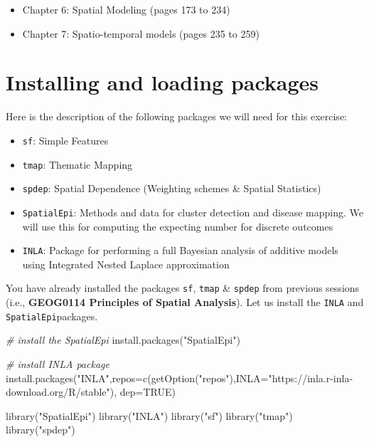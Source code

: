 \documentclass[
]{book}
\newenvironment{Shaded}{\begin{snugshade}}{\end{snugshade}}
\newcommand{\AttributeTok}[1]{\textcolor[rgb]{0.77,0.63,0.00}{#1}}
\newcommand{\CommentTok}[1]{\textcolor[rgb]{0.56,0.35,0.01}{\textit{#1}}}
\newcommand{\ConstantTok}[1]{\textcolor[rgb]{0.00,0.00,0.00}{#1}}
\newcommand{\FunctionTok}[1]{\textcolor[rgb]{0.00,0.00,0.00}{#1}}
\newcommand{\NormalTok}[1]{#1}
\newcommand{\StringTok}[1]{\textcolor[rgb]{0.31,0.60,0.02}{#1}}
\begin{document}
\begin{itemize}
\item
  Chapter 6: Spatial Modeling (pages 173 to 234)
\item
  Chapter 7: Spatio-temporal models (pages 235 to 259)
\end{itemize}

\hypertarget{installing-and-loading-packages}{%
\section{Installing and loading packages}\label{installing-and-loading-packages}}

Here is the description of the following packages we will need for this exercise:

\begin{itemize}
\item
  \texttt{sf}: Simple Features
\item
  \texttt{tmap}: Thematic Mapping
\item
  \texttt{spdep}: Spatial Dependence (Weighting schemes \& Spatial Statistics)
\item
  \texttt{SpatialEpi}: Methods and data for cluster detection and disease mapping. We will use this for computing the expecting number for discrete outcomes
\item
  \texttt{INLA}: Package for performing a full Bayesian analysis of additive models using Integrated Nested Laplace approximation
\end{itemize}

You have already installed the packages \texttt{sf}, \texttt{tmap} \& \texttt{spdep} from previous sessions (i.e., \textbf{GEOG0114 Principles of Spatial Analysis}). Let us install the \texttt{INLA} and \texttt{SpatialEpi}packages.

\begin{Shaded}
\begin{Highlighting}[]
\CommentTok{\# install the SpatialEpi}
\FunctionTok{install.packages}\NormalTok{(}\StringTok{"SpatialEpi"}\NormalTok{)}

\CommentTok{\# install INLA package}
\FunctionTok{install.packages}\NormalTok{(}\StringTok{"INLA"}\NormalTok{,}\AttributeTok{repos=}\FunctionTok{c}\NormalTok{(}\FunctionTok{getOption}\NormalTok{(}\StringTok{"repos"}\NormalTok{),}\AttributeTok{INLA=}\StringTok{"https://inla.r{-}inla{-}download.org/R/stable"}\NormalTok{), }\AttributeTok{dep=}\ConstantTok{TRUE}\NormalTok{)}

\FunctionTok{library}\NormalTok{(}\StringTok{"SpatialEpi"}\NormalTok{)}
\FunctionTok{library}\NormalTok{(}\StringTok{"INLA"}\NormalTok{)}
\FunctionTok{library}\NormalTok{(}\StringTok{"sf"}\NormalTok{)}
\FunctionTok{library}\NormalTok{(}\StringTok{"tmap"}\NormalTok{)}
\FunctionTok{library}\NormalTok{(}\StringTok{"spdep"}\NormalTok{)}
\end{Highlighting}
\end{Shaded}
\end{document}
